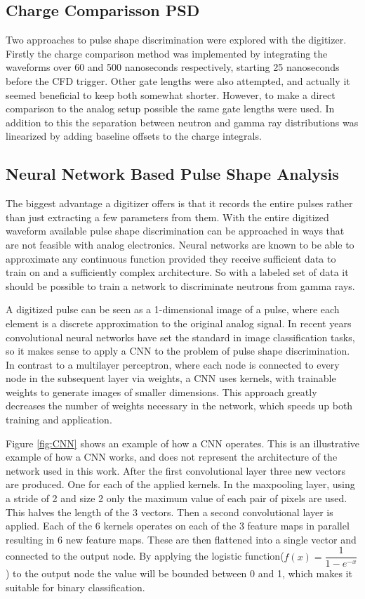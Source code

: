 \documentclass[main.tex]{subfiles}
\begin{document}
\subsection{Charge Comparisson PSD}
Two approaches to pulse shape discrimination were explored with the digitizer. Firstly the charge comparison method was implemented by integrating the waveforms over 60 and 500 nanoseconds respectively, starting 25 nanoseconds before the CFD trigger. Other gate lengths were also attempted, and actually it seemed beneficial to keep both somewhat shorter. However, to make a direct comparison to the analog setup possible the same gate lengths were used. In addition to this the separation between neutron and gamma ray distributions was linearized by adding baseline offsets to the charge integrals.

\subsection{Neural Network Based Pulse Shape Analysis}\label{sec:cnn}
The biggest advantage a digitizer offers is that it records the entire pulses rather than just extracting a few parameters from them. With the entire digitized waveform available pulse shape discrimination can be approached in ways that are not feasible with analog electronics. Neural networks are known to be able to approximate any continuous function provided they receive sufficient data to train on and a sufficiently complex architecture. So with a labeled set of data it should be possible to train a network to discriminate neutrons from gamma rays. 

A digitized pulse can be seen as a 1-dimensional image of a pulse, where each element is a discrete approximation to the original analog signal. In recent years convolutional neural networks have set the standard in image classification tasks, so it makes sense to apply a CNN to the problem of pulse shape discrimination.  In contrast to a multilayer perceptron, where each node is connected to every node in the subsequent layer via weights, a CNN uses kernels, with trainable weights to generate images of smaller dimensions. This approach greatly decreases the number of weights necessary in the network, which speeds up both training and application\cite[p.330]{Goodfellow-et-al-2016}.

Figure \ref{fig:CNN} shows an example of how a CNN operates. This is an illustrative example of how a CNN works, and does not represent the architecture of the network used in this work. After the first convolutional layer three new vectors are produced. One for each of the applied kernels. In the maxpooling layer, using a stride of 2 and size 2 only the maximum value of each pair of pixels are used. This halves the length of the 3 vectors. Then a second convolutional layer is applied. Each of the 6 kernels operates on each of the 3 feature maps in parallel resulting in 6 new feature maps. These are then flattened into a single vector and connected to the output node. By applying the logistic function($f(x)=\dfrac{1}{1-e^{-x}}$) to the output node the value will be bounded between 0 and 1, which makes it suitable for binary classification.
\end{document}
